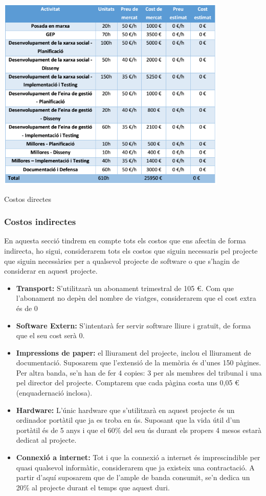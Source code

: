 \documentclass[11pt,catalan,listoffigures,listoftables]{tfgetsinf}
\begin{document}
\begin{table}[H]
\centering
\includegraphics[width=11cm]{images/taula2}
\caption[Taula 7.1]{Costos directes}
\centering
\end{table}

\subsubsection{Costos indirectes}

En aquesta secció tindrem en compte tots els costos que ens afectin de forma indirecta, ho sigui, considerarem tots els costos que siguin necessaris pel projecte que siguin necessàries per a qualsevol projecte de software o que s’hagin de considerar en aquest projecte.
\begin{itemize}
	\item \textbf{Transport:} S’utilitzarà un abonament trimestral de 105 €. Com que l’abonament no depèn del nombre de viatges, considerarem que el cost extra és de 0%
	\item \textbf{Software Extern:} S’intentarà fer servir software lliure i gratuït, de forma que el seu cost serà 0.
	\item \textbf{Impressions de paper:} el lliurament del projecte, inclou el lliurament de documentació. Suposarem que l’extensió de la memòria és d’unes 150 pàgines. Per altra banda, se’n han de fer 4 copies: 3 per als membres del tribunal i una pel director del projecte. Comptarem que cada pàgina costa uns 0,05 € (enquadernació inclosa).
	\item \textbf{Hardware:} L’únic hardware que s’utilitzarà en aquest projecte és un ordinador portàtil que ja es troba en ús. Suposant que la vida útil d’un portàtil és de 5 anys i que el 60\% del seu ús durant els propers 4 mesos estarà dedicat al projecte.
	\item \textbf{Connexió a internet:} Tot i que la connexió a internet és imprescindible per quasi qualsevol informàtic, considerarem que ja existeix una contractació. A partir d’aquí suposarem que de l’ample de banda consumit, se’n dedica un 20\% al projecte durant el temps que aquest duri.
\end{itemize} 
\end{document}
